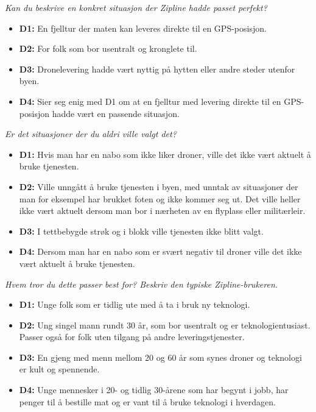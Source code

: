 \textit{Kan du beskrive en konkret situasjon der Zipline hadde passet
perfekt?}
\begin{itemize}[leftmargin=1.5em, nosep]
  \item \textbf{D1:} En fjelltur der maten kan leveres direkte til en
  GPS-posisjon.
  \item \textbf{D2:} For folk som bor usentralt og kronglete til.
  \item \textbf{D3:} Dronelevering hadde vært nyttig på hytten eller andre steder utenfor byen.
  \item \textbf{D4:} Sier seg enig med D1 om at en fjelltur med levering
  direkte til en GPS-posisjon hadde vært en passende situasjon.
\end{itemize}

\textit{Er det situasjoner der du aldri ville valgt det?}
\begin{itemize}[leftmargin=1.5em, nosep]
  \item \textbf{D1:} Hvis man har en nabo som ikke liker droner, ville det
  ikke vært aktuelt å bruke tjenesten.
  \item \textbf{D2:} Ville unngått å bruke tjenesten i byen, med unntak av
  situasjoner der man for eksempel har brukket foten og ikke kommer seg ut.
  Det ville heller ikke vært aktuelt dersom man bor i nærheten av en
  flyplass eller militærleir.
  \item \textbf{D3:} I tettbebygde strøk og i blokk ville tjenesten ikke
  blitt valgt.
  \item \textbf{D4:} Dersom man har en nabo som er svært negativ til droner
  ville det ikke vært aktuelt å bruke tjenesten.
\end{itemize}

\textit{Hvem tror du dette passer best for? Beskriv den typiske
Zipline-brukeren.}
\begin{itemize}[leftmargin=1.5em, nosep]
  \item \textbf{D1:} Unge folk som er tidlig ute med å ta i bruk ny teknologi.
  \item \textbf{D2:} Ung singel mann rundt 30 år, som bor usentralt og er
  teknologientusiast. Passer også for folk uten tilgang på andre
  leveringstjenester.
  \item \textbf{D3:} En gjeng med menn mellom 20 og 60 år som synes droner og
  teknologi er kult og spennende.
  \item \textbf{D4:} Unge mennesker i 20- og tidlig 30-årene som har begynt
  i jobb, har penger til å bestille mat og er vant til å bruke teknologi i
  hverdagen.
\end{itemize}

